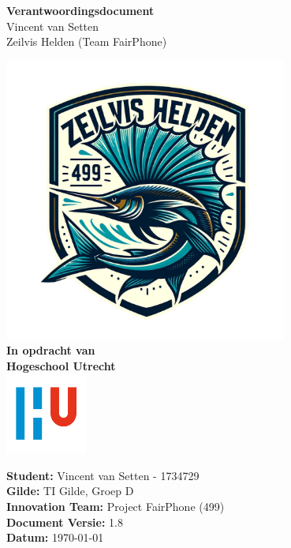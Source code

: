 \documentclass[a4paper]{report}
\newcommand{\latestVersion}{1.8}
\begin{document}
\begin{titlepage}
  \begin{center}
      \vspace*{.6cm}
      \Huge
      \textbf{ Verantwoordingsdocument }\\
      \vspace{0.2cm}
      \small Vincent van Setten \\
      \small Zeilvis Helden (Team FairPhone)

      \normalsize


      \vspace{1cm}
      \includegraphics[width=0.7\textwidth]{Images/zeilvis_helden.png}
      \vspace{1cm}
      \Large\\
      \textbf{In opdracht van}\\
      \large
      \textbf{Hogeschool Utrecht} \\
      \includegraphics[width=0.2\textwidth]{Images/logouni.png}


      \vfill
    \end{center}
      \textbf{Student:} Vincent van Setten - 1734729 \\
      \textbf{Gilde:} TI Gilde, Groep D\\
      \textbf{Innovation Team:} Project FairPhone (499) \\
      \textbf{Document Versie:} \latestVersion \\
      \textbf{Datum:} \today \\
      \vspace{2cm}
\end{titlepage}
\end{document}
